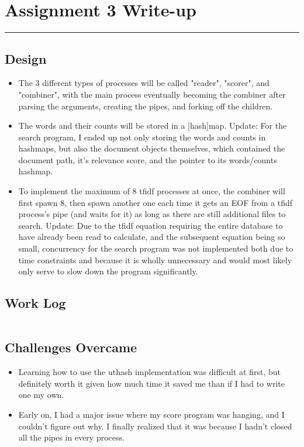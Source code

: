 \documentclass[letterpaper,10pt,fleqn]{article}
\numberwithin{equation}{section}
\begin{document}

\section*{Assignment 3 Write-up}
\hrule

\subsection*{Design}
\begin{itemize}
    \item The 3 different types of processes will be called "reader", "scorer", and "combiner", with the main process eventually becoming the combiner after parsing the arguments, creating the pipes, and forking off the children.
    \item The words and their counts will be stored in a [hash]map.  Update: For the search program, I ended up not only storing the words and counts in hashmaps, but also the document objects themselves, which contained the document path, it's relevance score, and the pointer to its words/counts hashmap.
    \item To implement the maximum of 8 tfidf processes at once, the combiner will first spawn 8, then spawn another one each time it gets an EOF from a tfidf process's pipe (and waits for it) as long as there are still additional files to search.  Update: Due to the tfidf equation requiring the entire database to have already been read to calculate, and the subsequent equation being so small, concurrency for the search program was not implemented both due to time constraints and because it is wholly unnecessary and would most likely only serve to slow down the program significantly.
\end{itemize}

\subsection*{Work Log}
\begin{verbatim}

\end{verbatim}

\subsection*{Challenges Overcame}
\begin{itemize}
    \item Learning how to use the uthash implementation was difficult at first, but definitely worth it given how much time it saved me than if I had to write one my own.
    \item Early on, I had a major issue where my score program was hanging, and I couldn't figure out why.  I finally realized that it was because I hadn't closed all the pipes in every process.
\end{itemize}
\end{document}
